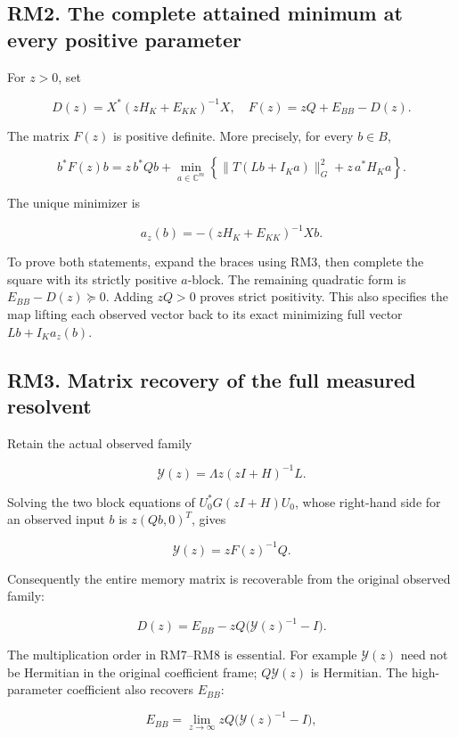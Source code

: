 \documentclass[11pt]{article}
\begin{document}
\subsection{RM2. The complete attained minimum at every positive parameter}\label{rm2.-the-complete-attained-minimum-at-every-positive-parameter}

For \(z>0\), set

\[
 D(z)=X^*(zH_K+E_{KK})^{-1}X,\quad
 F(z)=zQ+E_{BB}-D(z).
 \tag{RM4}
\]

The matrix \(F(z)\) is positive definite. More precisely, for every \(b\in B\),

\[
 b^*F(z)b=z\,b^*Qb+
 \min_{a\in\mathbb C^m}\left\{\|T(Lb+I_Ka)\|_G^2+z\,a^*H_Ka\right\}.
 \tag{RM5}
\]

The unique minimizer is

\[
 a_z(b)=-(zH_K+E_{KK})^{-1}Xb.
 \tag{RM6}
\]

To prove both statements, expand the braces using RM3, then complete the square with its strictly positive \(a\)-block. The remaining quadratic form is \(E_{BB}-D(z)\succeq0\). Adding \(zQ>0\) proves strict positivity. This also specifies the map lifting each observed vector back to its exact minimizing full vector \(Lb+I_Ka_z(b)\).

\subsection{RM3. Matrix recovery of the full measured resolvent}\label{rm3.-matrix-recovery-of-the-full-measured-resolvent}

Retain the actual observed family

\[
 \mathscr Y(z)=\Lambda z(zI+H)^{-1}L.
\]

Solving the two block equations of \(U_0^*G(zI+H)U_0\), whose right-hand side for an observed input \(b\) is \(z(Qb,0)^T\), gives

\[
 \boxed{\mathscr Y(z)=zF(z)^{-1}Q.}
 \tag{RM7}
\]

Consequently the entire memory matrix is recoverable from the original observed family:

\[
 \boxed{D(z)=E_{BB}-zQ\bigl(\mathscr Y(z)^{-1}-I\bigr).}
 \tag{RM8}
\]

The multiplication order in RM7--RM8 is essential. For example \(\mathscr Y(z)\) need not be Hermitian in the original coefficient frame; \(Q\mathscr Y(z)\) is Hermitian. The high-parameter coefficient also recovers \(E_{BB}\):

\[
 E_{BB}=\lim_{z\to\infty}zQ\bigl(\mathscr Y(z)^{-1}-I\bigr),
 \tag{RM9}
\]
\end{document}
